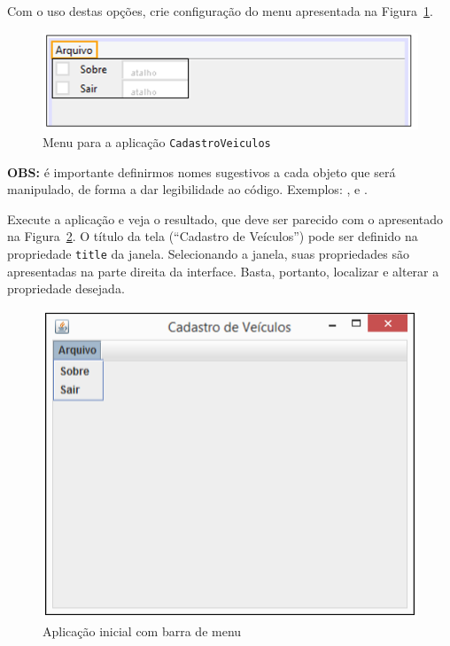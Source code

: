 Com o uso destas opções, crie configuração do menu apresentada na Figura~\ref{fig:gui-menu}.

\begin{figure}[h]
	\centering
	\includegraphics[width=0.4\textheight]{img/gui-menu}
	\caption{Menu para a aplicação \texttt{CadastroVeiculos}}
	\label{fig:gui-menu}
\end{figure}

\textbf{OBS:} é importante definirmos nomes sugestivos a cada objeto que será manipulado, de forma a dar legibilidade ao código. Exemplos: ,  e .

Execute a aplicação e veja o resultado, que deve ser parecido com o apresentado na Figura~\ref{fig:gui-aplicacao-inicial}. O título da tela (``Cadastro de Veículos'') pode ser definido na propriedade \texttt{title} da janela. Selecionando a janela, suas propriedades são apresentadas na parte direita da interface. Basta, portanto, localizar e alterar a propriedade desejada.

\begin{figure}[h]
	\centering
	\includegraphics[width=0.4\textheight]{img/gui-aplicacao-inicial}
	\caption{Aplicação inicial com barra de menu}
	\label{fig:gui-aplicacao-inicial}
\end{figure}

